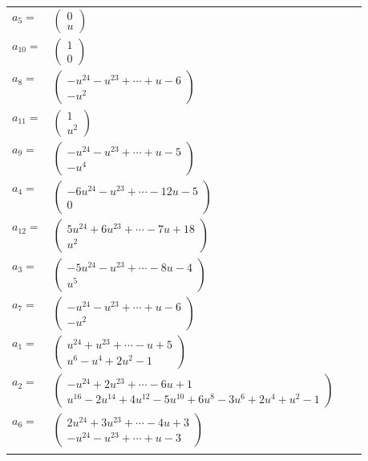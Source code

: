 \documentclass[1p]{elsarticle_modified}
\theoremstyle{definition}
\begin{document}
\begin{tabular}{m{7pt} m{180pt} m{7pt} m{180pt} }
\flushright $a_{5}=$&$\begin{pmatrix}0\\u\end{pmatrix}$ \\
\flushright $a_{10}=$&$\begin{pmatrix}1\\0\end{pmatrix}$ \\
\flushright $a_{8}=$&$\begin{pmatrix}- u^{24}- u^{23}+\cdots+u-6\\- u^2\end{pmatrix}$ \\
\flushright $a_{11}=$&$\begin{pmatrix}1\\u^2\end{pmatrix}$ \\
\flushright $a_{9}=$&$\begin{pmatrix}- u^{24}- u^{23}+\cdots+u-5\\- u^4\end{pmatrix}$ \\
\flushright $a_{4}=$&$\begin{pmatrix}-6 u^{24}- u^{23}+\cdots-12 u-5\\0\end{pmatrix}$ \\
\flushright $a_{12}=$&$\begin{pmatrix}5 u^{24}+6 u^{23}+\cdots-7 u+18\\u^2\end{pmatrix}$ \\
\flushright $a_{3}=$&$\begin{pmatrix}-5 u^{24}- u^{23}+\cdots-8 u-4\\u^5\end{pmatrix}$ \\
\flushright $a_{7}=$&$\begin{pmatrix}- u^{24}- u^{23}+\cdots+u-6\\- u^2\end{pmatrix}$ \\
\flushright $a_{1}=$&$\begin{pmatrix}u^{24}+u^{23}+\cdots- u+5\\u^6- u^4+2 u^2-1\end{pmatrix}$ \\
\flushright $a_{2}=$&$\begin{pmatrix}- u^{24}+2 u^{23}+\cdots-6 u+1\\u^{16}-2 u^{14}+4 u^{12}-5 u^{10}+6 u^8-3 u^6+2 u^4+u^2-1\end{pmatrix}$ \\
\flushright $a_{6}=$&$\begin{pmatrix}2 u^{24}+3 u^{23}+\cdots-4 u+3\\- u^{24}- u^{23}+\cdots+u-3\end{pmatrix}$\\&\end{tabular}
\end{document}
